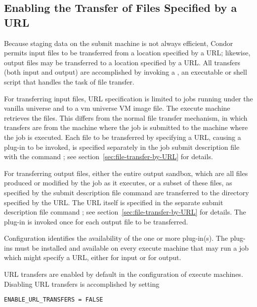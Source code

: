 \subsection{\label{sec:URL-transfer}
Enabling the Transfer of Files Specified by a URL}

Because staging data on the submit machine is not always efficient,
Condor permits input files to be transferred
from a location specified by a URL;
likewise, output files may be transferred
to a location specified by a URL.
All transfers (both input and output) are accomplished by invoking 
a ,
an executable or shell script that handles the task of file transfer.

For transferring input files,
URL specification is limited to jobs running under the vanilla universe 
and to a vm universe VM image file.
The execute machine retrieves the files.
This differs from the normal file transfer mechanism,
in which transfers are from the machine where the job is submitted
to the machine where the job is executed.
Each file to be transferred by specifying a URL, causing a
plug-in to be invoked, is specified separately in the job submit
description file with the command ;
see section~\ref{sec:file-transfer-by-URL} for details.

For transferring output files,
either the entire output sandbox, which are all files produced or
modified by the job as it executes, or a subset of these files,
as specified by the submit description file command 
 are transferred to the
directory specified by the URL.
The URL itself is specified in the separate submit description file command 
;
see section~\ref{sec:file-transfer-by-URL} for details.
The plug-in is invoked once for each output file to be transferred.

Configuration identifies the availability of the one or more plug-in(s).
The plug-ins must be installed and available on every execute machine 
that may run a job which might specify a URL, either for input or for output.

URL transfers are enabled by default in the configuration 
of execute machines.
Disabling URL transfers is accomplished by setting
\footnotesize
\begin{verbatim}
ENABLE_URL_TRANSFERS = FALSE
\end{verbatim}
\normalsize

